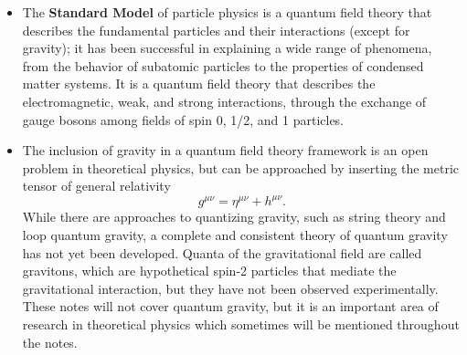 \begin{itemize}
\begin{itemize}
              \item \textbf{Spinor field}: \(\psi(x)\) \(\implies\) spin-1/2 particles (e.g., electrons, quarks).
              \item \textbf{Vector field}: \(A_\mu(x)\) \(\implies\) spin-1 particles (e.g., photons, W and Z bosons).
          \end{itemize}
    \item The \textbf{Standard Model} of particle physics is a quantum field theory that describes the fundamental particles and their interactions (except for gravity); it has been successful in explaining a wide range of phenomena, from the behavior of subatomic particles to the properties of condensed matter systems. It is a quantum field theory that describes the electromagnetic, weak, and strong interactions, through the exchange of gauge bosons among fields of spin 0, 1/2, and 1 particles.
    \item The inclusion of gravity in a quantum field theory framework is an open problem in theoretical physics, but can be approached by inserting the metric tensor of general relativity
          \[
              g^{\mu \nu} = \eta^{\mu \nu} + h^{\mu \nu}.
          \]
          While there are approaches to quantizing gravity, such as string theory and loop quantum gravity, a complete and consistent theory of quantum gravity has not yet been developed. Quanta of the gravitational field are called gravitons, which are hypothetical spin-2 particles that mediate the gravitational interaction, but they have not been observed experimentally. These notes will not cover quantum gravity, but it is an important area of research in theoretical physics which sometimes will be mentioned throughout the notes.
\end{itemize}

